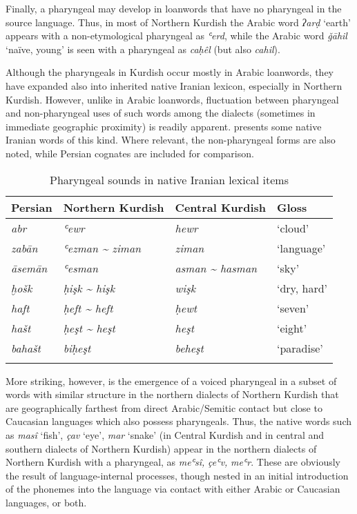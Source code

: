 \documentclass[output=paper]{langsci/langscibook}
\begin{document}
Finally, a pharyngeal may develop in loanwords that have no pharyngeal in the source language. Thus, in most of Northern Kurdish the Arabic word \textit{ʔarḍ} ‘earth’ appears with a non-etymological pharyngeal as \textit{ʿerd}, while the Arabic word \textit{ǧāhil} ‘naïve, young’ is seen with a pharyngeal as \textit{caḥêl} (but also \textit{cahil}).    

Although the pharyngeals in Kurdish occur mostly in Arabic loanwords, they have expanded also into inherited native Iranian lexicon, especially in Northern Kurdish. However, unlike in Arabic loanwords, fluctuation between pharyngeal and non-pharyngeal uses of such words among the dialects (sometimes in immediate geographic proximity) is readily apparent.  presents some native Iranian words of this kind. Where relevant, the non-pharyngeal forms are also noted, while Persian cognates are included for comparison.  

\begin{table}
\begin{tabular}{llll}
\lsptoprule
{Persian} & {Northern Kurdish} & {Central Kurdish} & {Gloss}\\\midrule
\textit{abr} & \textit{ʿewr} & \textit{hewr} & ‘cloud’\\
\textit{zabān} & \textit{ʿezman {\textasciitilde} ziman} & \textit{ziman} & ‘language’\\
\textit{āsemān} & \textit{ʿesman} & \textit{asman {\textasciitilde} hasman} & ‘sky’\\
\textit{ḫošk} & \textit{ḥişk {\textasciitilde} hişk}  & \textit{wişk} & ‘dry, hard’\\
\textit{haft} & \textit{ḥeft {\textasciitilde} heft} & \textit{ḥewt}  & ‘seven’\\
\textit{hašt} & \textit{ḥeşt {\textasciitilde} heşt} & \textit{heşt} & ‘eight’\\
\textit{bahašt} & \textit{biḥeşt} & \textit{beheşt} & ‘paradise’\\
\lspbottomrule
\end{tabular}
\caption{\label{bkm:Ref14705119}Pharyngeal sounds in native Iranian lexical items}
\label{tab:opengin:4}
\end{table}

More striking, however, is the emergence of a voiced pharyngeal in a subset of words with similar structure in the northern dialects of Northern Kurdish that are geographically farthest from direct Arabic/Semitic contact but close to Caucasian languages which also possess pharyngeals. Thus, the native words such as \textit{masî} ‘fish’, \textit{çav} ‘eye’, \textit{mar} ‘snake’ (in Central Kurdish and in central and southern dialects of Northern Kurdish) appear in the northern dialects of Northern Kurdish with a pharyngeal, as \textit{meʿsî,} \textit{çeʿv,} \textit{meʿr}. These are obviously the result of language-internal processes, though nested in an initial introduction of the phonemes into the language via contact with either Arabic or Caucasian languages, or both.
\end{document}
